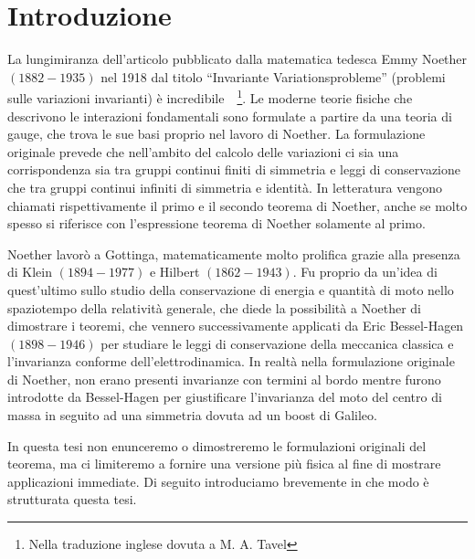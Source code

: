 \chapter{Introduzione}

    La lungimiranza dell'articolo pubblicato dalla matematica tedesca Emmy Noether $(1882-1935)$ nel 1918 dal titolo ``Invariante Variationsprobleme'' (problemi sulle variazioni invarianti) è incredibile~\cite{noether}~\cite{noether2}\footnote{Nella traduzione inglese dovuta a M. A. Tavel}. Le moderne teorie fisiche che descrivono le interazioni fondamentali sono formulate a partire da una teoria di gauge, che trova le sue basi proprio nel lavoro di Noether. La formulazione originale prevede che nell'ambito del calcolo delle variazioni ci sia una corrispondenza sia tra gruppi continui finiti di simmetria e leggi di conservazione che tra gruppi continui infiniti di simmetria e identità. In letteratura vengono chiamati rispettivamente il primo e il secondo teorema di Noether, anche se molto spesso si riferisce con l'espressione teorema di Noether solamente al primo. 
    
    Noether lavorò a Gottinga, matematicamente molto prolifica grazie alla presenza di Klein $(1894-1977)$ e Hilbert $(1862-1943)$. Fu proprio da un'idea di quest'ultimo sullo studio della conservazione di energia e quantità di moto nello spaziotempo della relatività generale, che diede la possibilità a Noether di dimostrare i teoremi, che vennero successivamente applicati da Eric Bessel-Hagen $(1898-1946)$ per studiare le leggi di conservazione della meccanica classica e l'invarianza conforme dell'elettrodinamica. In realtà nella formulazione originale di Noether, non erano presenti invarianze con termini al bordo mentre furono introdotte da Bessel-Hagen per giustificare l'invarianza del moto del centro di massa in seguito ad una simmetria dovuta ad un boost di Galileo.

    In questa tesi non enunceremo o dimostreremo le formulazioni originali del teorema, ma ci limiteremo a fornire una versione più fisica al fine di mostrare applicazioni immediate. Di seguito introduciamo brevemente in che modo è strutturata questa tesi.
    
